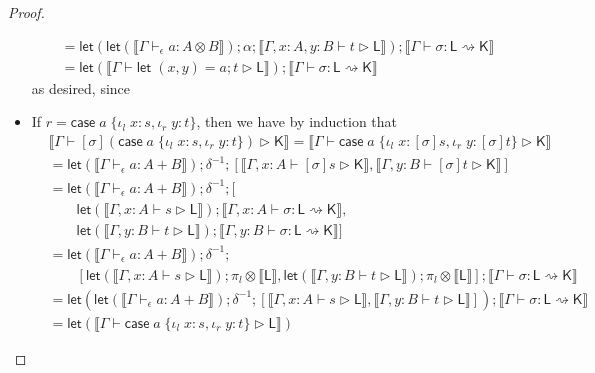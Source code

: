 \documentclass[acmsmall,screen,review]{acmart}
\newcommand{\ms}[1]{\ensuremath{\mathsf{#1}}}
\newcommand{\lto}{:}
\newcommand{\linl}[1]{\iota_l\;{#1}}
\newcommand{\linr}[1]{\iota_r\;{#1}}
\newcommand{\letstmt}[3]{\ensuremath{\ms{let}\;#1 = #2; #3}}
\newcommand{\casestmt}[5]{\ms{case}\;#1\;\{\linl{#2} \lto #3, \linr{#4} \lto #5\}}
\newcommand{\bhyp}[2]{#1 : #2}
\newcommand{\hasty}[4]{#1 \vdash_{#2} #3: {#4}}
\newcommand{\haslb}[3]{#1 \vdash #2 \rhd #3}
\newcommand{\lbsubst}[4]{#1 \vdash #2: #3 \rightsquigarrow #4}
\newcommand{\dnt}[1]{\llbracket{#1}\rrbracket}
\newcommand{\lmor}[1]{\ms{let}(#1)}
\begin{document}
\begin{proof}
\begin{itemize}[leftmargin=*]
\begin{equation}
\begin{aligned}
        & = \lmor{\lmor{\dnt{\hasty{\Gamma}{\epsilon}{a}{A \otimes B}}} ; \alpha 
            ; \dnt{\haslb{\Gamma, \bhyp{x}{A}, \bhyp{y}{B}}{t}{\ms{L}}}}
          ; \dnt{\lbsubst{\Gamma}{\sigma}{\ms{L}}{\ms{K}}} \\
        & = \lmor{\dnt{\haslb{\Gamma}{\letstmt{(x, y)}{a}{t}}{\ms{L}}}}
          ; \dnt{\lbsubst{\Gamma}{\sigma}{\ms{L}}{\ms{K}}}
      \end{aligned}
    \end{equation}
    as desired, since 
    \item If $r = \casestmt{a}{x}{s}{y}{t}$, then we have by induction that
    \begin{equation}
      \begin{aligned}
        & \dnt{\haslb{\Gamma}{[\sigma](\casestmt{a}{x}{s}{y}{t})}{\ms{K}}} 
          = \dnt{\haslb{\Gamma}{\casestmt{a}{x}{[\sigma]s}{y}{[\sigma]t}}{\ms{K}}} \\
        & = \lmor{\dnt{\hasty{\Gamma}{\epsilon}{a}{A + B}}} ; \delta^{-1}
          ; [\dnt{\haslb{\Gamma, \bhyp{x}{A}}{[\sigma]s}{\ms{K}}}, 
              \dnt{\haslb{\Gamma, \bhyp{y}{B}}{[\sigma]t}{\ms{K}}}] \\
        & = \lmor{\dnt{\hasty{\Gamma}{\epsilon}{a}{A + B}}} ; \delta^{-1} ; [
        \\ & \qquad 
            \lmor{\dnt{\haslb{\Gamma, \bhyp{x}{A}}{s}{\ms{L}}}} 
              ; \dnt{\lbsubst{\Gamma, \bhyp{x}{A}}{\sigma}{\ms{L}}{\ms{K}}},
        \\ & \qquad
            \lmor{\dnt{\haslb{\Gamma, \bhyp{y}{B}}{t}{\ms{L}}}}
              ; \dnt{\lbsubst{\Gamma, \bhyp{y}{B}}{\sigma}{\ms{L}}{\ms{K}}}
          ] \\
        & = \lmor{\dnt{\hasty{\Gamma}{\epsilon}{a}{A + B}}} ; \delta^{-1} ;
        \\ & \qquad [
              \lmor{\dnt{\haslb{\Gamma, \bhyp{x}{A}}{s}{\ms{L}}}} ; \pi_l \otimes \dnt{\ms{L}}, 
              \lmor{\dnt{\haslb{\Gamma, \bhyp{y}{B}}{t}{\ms{L}}}} ; \pi_l \otimes \dnt{\ms{L}}] 
          ; \dnt{\lbsubst{\Gamma}{\sigma}{\ms{L}}{\ms{K}}} \\
        & = \lmor{
            \lmor{\dnt{\hasty{\Gamma}{\epsilon}{a}{A + B}}} 
            ; \delta^{-1} 
            ; [\dnt{\haslb{\Gamma, \bhyp{x}{A}}{s}{\ms{L}}}, 
              \dnt{\haslb{\Gamma, \bhyp{y}{B}}{t}{\ms{L}}}]}
          ; \dnt{\lbsubst{\Gamma}{\sigma}{\ms{L}}{\ms{K}}} \\
        & = \lmor{\dnt{\haslb{\Gamma}{\casestmt{a}{x}{s}{y}{t}}{\ms{L}}}}

\end{aligned}
\end{equation}
\end{itemize}
\end{proof}
\end{document}
